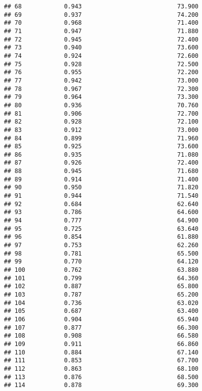 \documentclass[
]{article}
\begin{document}
\begin{verbatim}
## 68            0.943                           73.900
## 69            0.937                           74.200
## 70            0.968                           71.400
## 71            0.947                           71.880
## 72            0.945                           72.400
## 73            0.940                           73.600
## 74            0.924                           72.600
## 75            0.928                           72.500
## 76            0.955                           72.200
## 77            0.942                           73.000
## 78            0.967                           72.300
## 79            0.964                           73.300
## 80            0.936                           70.760
## 81            0.906                           72.700
## 82            0.928                           72.100
## 83            0.912                           73.000
## 84            0.899                           71.960
## 85            0.925                           73.600
## 86            0.935                           71.080
## 87            0.926                           72.400
## 88            0.945                           71.680
## 89            0.914                           71.400
## 90            0.950                           71.820
## 91            0.944                           71.540
## 92            0.684                           62.640
## 93            0.786                           64.600
## 94            0.777                           64.900
## 95            0.725                           63.640
## 96            0.854                           61.880
## 97            0.753                           62.260
## 98            0.781                           65.500
## 99            0.770                           64.120
## 100           0.762                           63.880
## 101           0.799                           64.360
## 102           0.887                           65.800
## 103           0.787                           65.200
## 104           0.736                           63.020
## 105           0.687                           63.400
## 106           0.904                           65.940
## 107           0.877                           66.300
## 108           0.908                           66.580
## 109           0.911                           66.860
## 110           0.884                           67.140
## 111           0.853                           67.700
## 112           0.863                           68.100
## 113           0.876                           68.500
## 114           0.878                           69.300

\end{verbatim}
\end{document}

